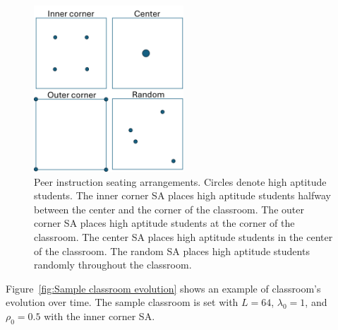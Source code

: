  \begin{figure}[htbp!]
    \centering
    \includegraphics[width=0.5\textwidth]{figures/PI SAs.png}
    \caption[Peer instruction seating arrangements.]{ Peer instruction seating arrangements. 
    Circles denote high aptitude students. 
    The inner corner SA places high aptitude students halfway between the center and the corner of the classroom. 
    The outer corner SA places high aptitude students at the corner of the classroom. 
    The center SA places high aptitude students in the center of the classroom. 
    The random SA places high aptitude students randomly throughout the classroom.}
    \label{fig:PI SAs}
 \end{figure}

 Figure~\ref{fig:Sample classroom evolution} shows an example of classroom's evolution over time. The sample classroom is set with $L=64$, $\lambda_0 = 1$, and $\rho_0 = 0.5$ with the inner corner SA.

